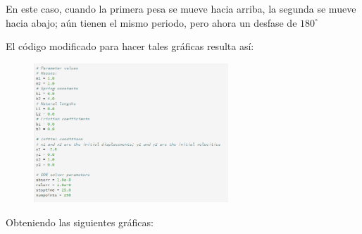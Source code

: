 \documentclass[a4paper]{article}
\begin{document}
En este caso, cuando la primera pesa se mueve hacia arriba, la segunda se mueve hacia abajo; aún tienen el mismo periodo, pero ahora un desfase de $180^\circ$

El código modificado para hacer tales gráficas resulta así:

\begin{figure}[ht!]
 \centering
  \includegraphics[width=0.65\textwidth]{Codigo2_1.PNG}
\end{figure}

Obteniendo las siguientes gráficas:
\pagebreak
\end{document}
